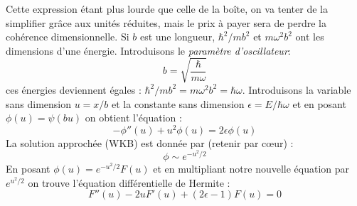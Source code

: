 \documentclass	[11pt, a4paper, openany]{book}
\begin{document}
Cette expression étant plus lourde que celle de la boîte, on va tenter de la simplifier grâce aux unités réduites, mais le prix à payer sera de perdre la cohérence dimensionnelle. Si $b$ est une longueur, $\hbar^2/mb^2$ et $m\omega^2b^2$ ont les dimensions d'une énergie.  Introduisons le \textit{paramètre d'oscillateur}:
\begin{equation}
b = \sqrt{\dfrac{\hbar}{m\omega}}
\end{equation}
ces énergies deviennent égales : $\hbar^2/mb^2 = m\omega^2b^2 = \hbar\omega$. Introduisons la variable sans dimension $u = x/b$ et la constante sans dimension $\epsilon = E/\hbar\omega$ et en posant $\phi(u) = \psi(bu)$ on obtient l'équation :
\begin{equation}
-\phi''(u) + u^2\phi(u) = 2\epsilon\phi(u)
\end{equation}
La solution approchée (WKB) est donnée par (retenir par cœur) :
\begin{equation}
\phi \sim e^{-u^2/2}
\end{equation}
En posant $\phi(u) = e^{-u^2/2}F(u)$ et en multipliant notre nouvelle équation par $e^{u^2/2}$ on trouve l'équation différentielle de Hermite :
\begin{equation}
F''(u) - 2uF'(u) + (2\epsilon - 1)F(u) = 0
\end{equation}
\end{document}
